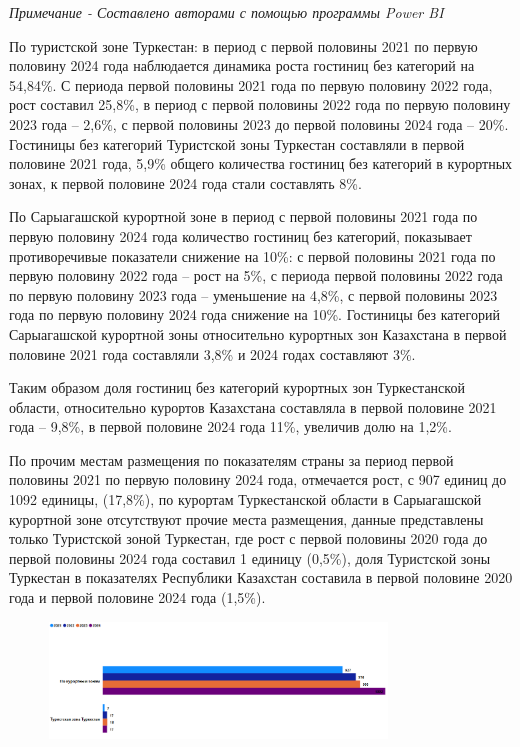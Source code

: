 \emph{Примечание - Составлено авторами с помощью программы Power BI}

По туристской зоне Туркестан: в период с первой половины 2021 по первую
половину 2024 года наблюдается динамика роста гостиниц без категорий на
54,84\%. С периода первой половины 2021 года по первую половину 2022
года, рост составил 25,8\%, в период с первой половины 2022 года по
первую половину 2023 года -- 2,6\%, с первой половины 2023 до первой
половины 2024 года -- 20\%. Гостиницы без категорий Туристской зоны
Туркестан составляли в первой половине 2021 года, 5,9\% общего
количества гостиниц без категорий в курортных зонах, к первой половине
2024 года стали составлять 8\%.

По Сарыагашской курортной зоне в период с первой половины 2021 года по
первую половину 2024 года количество гостиниц без категорий, показывает
противоречивые показатели снижение на 10\%: с первой половины 2021 года
по первую половину 2022 года -- рост на 5\%, с периода первой половины
2022 года по первую половину 2023 года -- уменьшение на 4,8\%, с первой
половины 2023 года по первую половину 2024 года снижение на 10\%.
Гостиницы без категорий Сарыагашской курортной зоны относительно
курортных зон Казахстана в первой половине 2021 года составляли 3,8\% и
2024 годах составляют 3\%.

Таким образом доля гостиниц без категорий курортных зон Туркестанской
области, относительно курортов Казахстана составляла в первой половине
2021 года -- 9,8\%, в первой половине 2024 года 11\%, увеличив долю на
1,2\%.

По прочим местам размещения по показателям страны за период первой
половины 2021 по первую половину 2024 года, отмечается рост, с 907
единиц до 1092 единицы, (17,8\%), по курортам Туркестанской области в
Сарыагашской курортной зоне отсутствуют прочие места размещения, данные
представлены только Туристской зоной Туркестан, где рост с первой
половины 2020 года до первой половины 2024 года составил 1 единицу
(0,5\%), доля Туристской зоны Туркестан в показателях Республики
Казахстан составила в первой половине 2020 года и первой половине 2024
года (1,5\%).


\begin{figure}[H]
	\centering
	\includegraphics[width=0.8\textwidth]{media/ekon/image4}
	\caption*{}
\end{figure}


